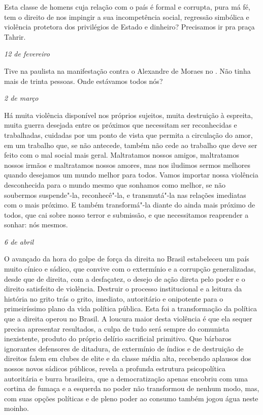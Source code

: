 Esta classe de homens cuja relação com o país é formal e corrupta, pura
má fé, tem o direito de nos impingir a sua incompetência social,
regressão simbólica e violência protetora dos privilégios de Estado e
dinheiro? Precisamos ir pra praça Tahrir.

\begin{flushright}
\emph{12 de fevereiro}
\end{flushright}

Tive na paulista na manifestação contra o Alexandre de Moraes no .
Não tinha mais de trinta pessoas. Onde estávamos todos nós?

\begin{flushright}
\emph{2 de março}
\end{flushright}

Há muita violência disponível nos próprios sujeitos, muita destruição à
espreita, muita guerra desejada entre os próximos que necessitam ser
reconhecidas e trabalhadas, cuidadas por um ponto de vista que permita a
circulação do amor, em um trabalho que, se não antecede, também não cede
ao trabalho que deve ser feito com o mal social mais geral. Maltratamos
nossos amigos, maltratamos nossos irmãos e maltratamos nossos amores,
mas nos iludimos sermos melhores quando desejamos um mundo melhor para
todos. Vamos importar nossa violência desconhecida para o mundo mesmo
que sonhamos como melhor, se não soubermos suspende"-la, reconhecê"-la, e
transmutá"-la nas relações imediatas com o mais próximo. E também
transformá"-la diante do ainda mais próximo de todos, que cai sobre nosso
terror e submissão, e que necessitamos reaprender a sonhar: nós mesmos.

\begin{flushright}
\emph{6 de abril}
\end{flushright}

O avançado da hora do golpe de força da direita no Brasil estabeleceu um
país muito cínico e sádico, que convive com o extermínio e a corrupção
generalizadas, desde que de direita, com a desfaçatez, o desejo de ação
direta pelo poder e o direito satisfeito de violência. Destruir o
processo institucional e a leitura da história no grito trás o grito,
imediato, autoritário e onipotente para o primeiríssimo plano da vida
política pública. Esta foi a transformação da política que a direita
operou no Brasil. A loucura maior desta violência é que ela sequer
precisa apresentar resultados, a culpa de tudo será sempre do comunista
inexistente, produto do próprio delírio sacrificial primitivo. Que
bárbaros ignorantes defensores de ditadura, de extermínio de índios e de
destruição de direitos falem em clubes de elite e da classe média alta,
recebendo aplausos dos nossos novos sádicos públicos, revela a profunda
estrutura psicopolítica autoritária e burra brasileira, que a
democratização apenas encobriu com uma cortina de fumaça e a esquerda no
poder não transformou de nenhum modo, mas, com suas opções políticas e
de pleno poder ao consumo também jogou água neste moinho.

